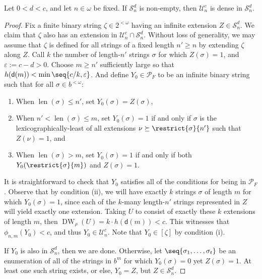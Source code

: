 \begin{lemma} 
    \label{lemma:density_of_U_and_S_same_indices}
    Let $0 < d < c$, and let $n \in \omega$ be fixed. If $\mathcal{S}^d_n$ is non-empty, then $\mathcal{U}^c_n$ is dense in $\mathcal{S}_n^d$.
\end{lemma}
\begin{proof}
    Fix a finite binary string $\zeta \in 2^{< \omega}$ having an infinite extension $Z \in \mathcal{S}^d_n$. We claim that $\zeta$ also has an extension in $\mathcal{U}^c_n \cap \mathcal{S}^d_n$. Without loss of generality, we may assume that $\zeta$ is defined for all strings of a fixed length $n' \geq n$ by extending $\zeta$ along $Z$. Call $k$ the number of length-$n'$ strings $\sigma$ for which $Z(\sigma) = 1$, and $\varepsilon := c - d > 0$. Choose $m \geq n'$ sufficiently large so that $h(\mathsf{d}(m)) < \min\seq{c / k, \varepsilon}$. And define $Y_0 \in \mathcal{P}_F$ to be an infinite binary string such that for all $\sigma \in b^{<\omega}$:
    \begin{enumerate}[label = (\roman*)]
        \item When $\operatorname{len}(\sigma) \leq n'$, set $Y_0(\sigma) = Z(\sigma)$,
        \item When $n' < \operatorname{len}(\sigma) \leq m$, set $Y_0(\sigma) = 1$ if and only if $\sigma$ is the lexicographically-least of all extensions $\nu \succeq \restrict{\sigma}{n'}$ such that $Z(\nu) = 1$, and
        \item When $\operatorname{len}(\sigma) > m$, set $Y_0(\sigma) = 1$ if and only if both $Y_0(\restrict{\sigma}{m})$ and $Z(\sigma) = 1$.
    \end{enumerate}
    
    It is straightforward to check that $Y_0$ satisfies all of the conditions for being in $\mathcal{P}_F$. Observe that by condition (ii), we will have exactly $k$ strings $\sigma$ of length $m$ for which $Y_0(\sigma) = 1$, since each of the $k$-many length-$n'$ strings represented in $Z$ will yield exactly one extension. Taking $U$ to consist of exactly these $k$ extensions of length $m$, then $\operatorname{DW}_\rho(U) = k \cdot h(\mathsf{d}(m)) < c$. This witnesses that $\phi_{n, m}(Y_0) < c$, and thus $Y_0 \in \mathcal{U}^c_n$. Note that $Y_0 \in [\zeta]$ by condition (i). 

    If $Y_0$ is also in $\mathcal{S}^d_n$, then we are done. Otherwise, let $\seq{\sigma_1, \dots , \sigma_t}$ be an enumeration of all of the strings in $b^m$ for which $Y_0(\sigma) = 0$ yet $Z(\sigma) = 1$. At least one such string exists, or else, $Y_0 = Z$, but $Z \in \mathcal{S}^d_n$. 
    

\end{proof}
